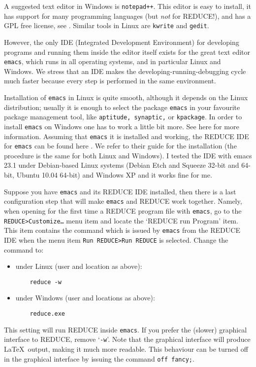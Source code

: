 \documentclass[12pt]{amsart}
\theoremstyle{definition}
\newcommand{\reduce}{REDUCE\xspace}
\begin{document}
A suggested text editor in Windows is \texttt{notepad++}. This editor is easy
to install, it has support for many programming languages (but \emph{not} for
\reduce!), and has a GPL free license, see \cite{noteppp}. Similar tools in
Linux are \texttt{kwrite} and \texttt{gedit}.

However, the only IDE (Integrated Development Environment) for developing
programs and running them inside the editor itself exists for the great text
editor \texttt{emacs}, which runs in all operating systems, and in particular
Linux and Windows. We stress that an IDE makes the developing-running-debugging
cycle much faster because every step is performed in the same environment.

Installation of \texttt{emacs} in Linux is quite smooth, although it depends on
the Linux distribution; usually it is enough to select the package
\texttt{emacs} in your favourite package management tool, like
\texttt{aptitude, synaptic,} or \texttt{kpackage}.  In order to install
\texttt{emacs} on Windows one has to work a little bit more. See here
\cite{emacswin} for more information.  Assuming that \texttt{emacs} it is
installed and working, the \reduce IDE for \texttt{emacs} can be found here
\cite{redide}.  We refer to their guide for the installation (the procedure is
the same for both Linux and Windows). I tested the IDE with emacs 23.1 under
Debian-based Linux systems (Debian Etch and Squeeze 32-bit and 64-bit, Ubuntu
10.04 64-bit) and Windows XP and it works fine for me.

Suppose you have \texttt{emacs} and its \reduce IDE installed, then there is a
last configuration step that will make \texttt{emacs} and \reduce work together.
Namely, when opening for the first time a \reduce program file with
\texttt{emacs}, go to the \texttt{REDUCE>Customize\dots} menu item and locate
the `\reduce run Program' item. This item contains the command which is issued
by \texttt{emacs} from the \reduce IDE when the menu item \texttt{Run REDUCE>Run
  REDUCE} is selected. Change the command to:
  \begin{itemize}
  \item under Linux (user and location as above):
   \begin{verbatim}
    reduce -w
    \end{verbatim}
  \item under Windows (user and locations as above):
   \begin{verbatim}
    reduce.exe
    \end{verbatim}
  \end{itemize}
This setting will run \reduce inside \texttt{emacs}. If you prefer the (slower)
graphical interface to \reduce, remove `\texttt{-w}'. Note that the graphical
interface will produce \LaTeX\ output, making it much more readable. This
behaviour can be turned off in the graphical interface by issuing the command
\texttt{off fancy;}.
\end{document}
